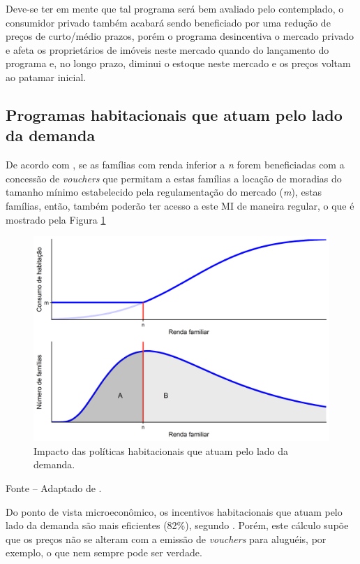 \documentclass[
	12pt,				%
	oneside,			%
	a4paper,			%
	chapter=TITLE,		%
	section=TITLE,		%
	english,			%
	brazil				%
	]{abntex2}
\newcommand{\bcenter}{\begin{center}}
\newcommand{\ecenter}{\end{center}}
\begin{document}
\begin{refsection}
Deve-se ter em mente que tal programa será bem avaliado pelo contemplado, o
consumidor privado também acabará sendo beneficiado por uma redução de preços de
curto/médio prazos, porém o programa desincentiva o mercado privado e afeta os
proprietários de imóveis neste mercado quando do lançamento do programa e, no
longo prazo, diminui o estoque neste mercado e os preços voltam ao patamar
inicial.

\hypertarget{programas-habitacionais-que-atuam-pelo-lado-da-demanda}{%
\subsection{Programas habitacionais que atuam pelo lado da demanda}\label{programas-habitacionais-que-atuam-pelo-lado-da-demanda}}

De acordo com \textcite[p.~260]{bertaud}, se as famílias com renda inferior a \emph{n} forem
beneficiadas com a concessão de \emph{vouchers} que permitam a estas famílias a
locação de moradias do tamanho mínimo estabelecido pela regulamentação do
mercado (\emph{m}), estas famílias, então, também poderão ter acesso a este \gls{MI}
de maneira regular, o que é mostrado pela Figura \ref{fig:vouchers}
\begin{figure}[H]

{\centering \includegraphics[width=0.7\linewidth]{images/vouchers-1} 

}

\caption{Impacto das políticas habitacionais que atuam pelo lado da demanda.}\label{fig:vouchers}
\end{figure}
\bcenter

\small Fonte -- Adaptado de \textcite[p.~260]{bertaud}.
\ecenter

Do ponto de vista microeconômico, os incentivos habitacionais que atuam pelo
lado da demanda são mais eficientes (82\%), segundo \textcite{malpezzi_affordable_2018_1}.
Porém, este cálculo supõe que os preços não se alteram com a emissão de
\emph{vouchers} para aluguéis, por exemplo, o que nem sempre pode ser verdade.


\end{refsection}
\end{document}
